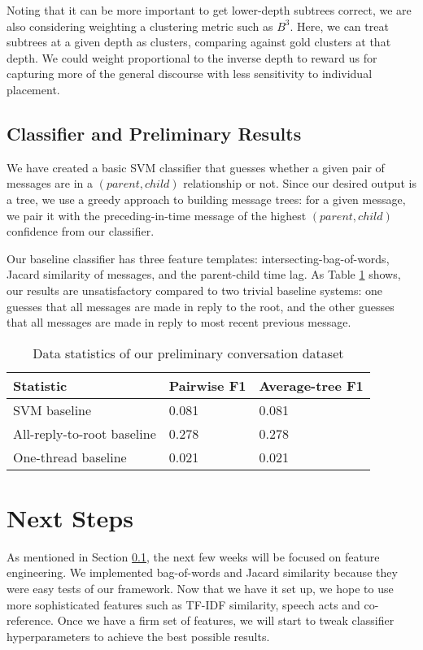 \documentclass[10pt]{article}
\begin{document}
Noting that it can be more important to get lower-depth subtrees correct, we
are also considering weighting a clustering metric such as $B^3$. Here, we can
treat subtrees at a given depth as clusters, comparing against gold clusters at
that depth. We could weight proportional to the inverse depth to reward us for
capturing more of the general discourse with less sensitivity to individual placement.

\subsection{Classifier and Preliminary Results}
\label{sec:classifier}
We have created a basic SVM classifier that guesses whether a given pair of messages are in a $(parent, child)$
relationship or not. Since our desired output is a tree, we use a greedy approach
to building message trees: for a given message, we pair it with the preceding-in-time 
message of the highest $(parent, child)$ confidence from our classifier. 

Our baseline classifier has three feature templates: intersecting-bag-of-words, 
Jacard similarity of messages, and the parent-child time lag. As Table \ref{table:results} shows, 
our results are unsatisfactory compared to two trivial baseline
systems: one guesses that all messages are made in reply to the root, and the
other guesses that all messages are made in reply to most recent previous message.

\begin{table}[h]\footnotesize
 \begin{tabular}{| l | l | l |} 
   \hline
   \textbf{Statistic} & Pairwise F1 & Average-tree F1 \\
   \hline
    SVM baseline & 0.081 & 0.081 \\
    All-reply-to-root baseline & 0.278 & 0.278 \\
    One-thread baseline & 0.021 & 0.021 \\
   \hline
  \end{tabular}
  \caption{Data statistics of our preliminary conversation dataset}
  \label{table:results}
\end{table}

\section{Next Steps}
As mentioned in Section \ref{sec:classifier}, the next few weeks will be focused
on feature engineering. We implemented bag-of-words and Jacard similarity
because they were easy tests of our framework. Now that we have it set up,
we hope to use more sophisticated features such as TF-IDF similarity, 
speech acts and co-reference. Once we have a firm set of features,
we will start to tweak classifier hyperparameters to achieve the best
possible results.
\end{document}
